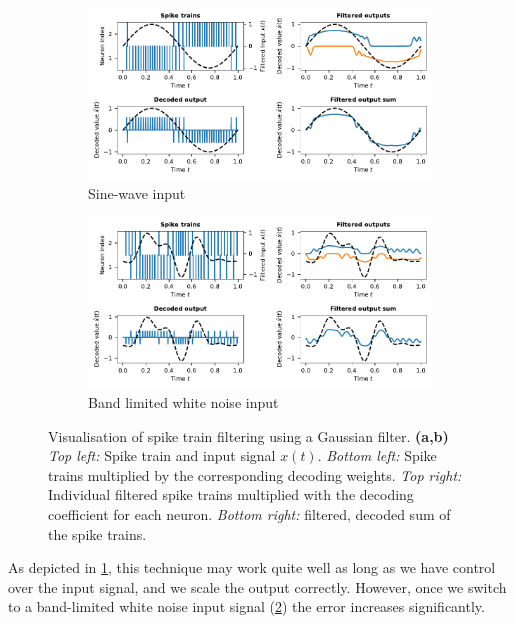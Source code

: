 \documentclass[10pt,letterpaper,oneside]{article}
\begin{document}
\begin{figure}
	\centering
	\begin{subfigure}{\textwidth}
		\includegraphics{media/two_neurons_filtered_small.pdf}
		\caption{Sine-wave input}
		\label{fig:two_neurons_filtered}
	\end{subfigure}
	\begin{subfigure}{\textwidth}
		\includegraphics{media/two_neurons_filtered_white_noise_small.pdf}
		\caption{Band limited white noise input}
		\label{fig:two_neurons_filtered_white_noise}
	\end{subfigure}
	\caption{Visualisation of spike train filtering using a Gaussian filter. \textbf{(a,b)} \emph{Top left:} Spike train and input signal $x(t)$. \emph{Bottom left:} Spike trains multiplied by the corresponding decoding weights. \emph{Top right:} Individual filtered spike trains multiplied with the decoding coefficient for each neuron. \emph{Bottom right:} filtered, decoded sum of the spike trains. }
	\label{fig:filtered}
\end{figure}

As depicted in \cref{fig:two_neurons_filtered}, this technique may work quite well as long as we have control over the input signal, and we scale the output correctly. However, once we switch to a band-limited white noise input signal (\cref{fig:two_neurons_filtered_white_noise}) the error increases significantly.
\end{document}
